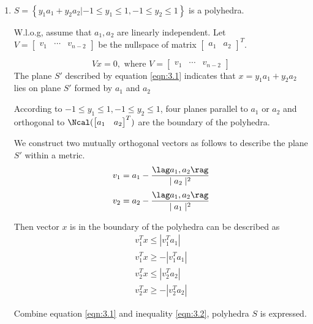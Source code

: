 \begin{solution}
\par{~}

\begin{enumerate}

\item { $S=\left\{y_{1} a_{1}+y_{2} a_{2} |-1 \leq y_{1} \leq 1,-1 \leq y_{2} \leq 1\right\}$ is a polyhedra.

W.l.o.g, assume that $a_1,a_2$ are linearly independent. Let $V = \begin{bmatrix} v_1 & \cdots & v_{n-2} \end{bmatrix} $ be the nullspace of matrix $ \begin{bmatrix} a_1 & a_2 \end{bmatrix} ^T $. 

\begin{equation}
Vx = 0, \text{ where }  V = \begin{bmatrix} v_1 & \cdots & v_{n-2} \end{bmatrix}
\label{eqn:3.1}
\end{equation}
The plane $S'$ described by equation \ref{eqn:3.1} indicates that $x = y_{1} a_{1}+y_{2} a_{2}$ lies on plane $S'$ formed by $a_1$ and $a_2$

According to $-1 \leq y_{1} \leq 1,-1 \leq y_{2} \leq 1$, four planes parallel to $a_1$ or $a_2$ and orthogonal to $\Ncal(\begin{bmatrix} a_1 & a_2 \end{bmatrix} ^T)$ are the boundary of the polyhedra.

We construct two mutually orthogonal vectors as follows to describe the plane $S'$ within a metric.
$$v_1 = a_1 - \frac{\lag a_1 , a_2\rag}{\mid a_2 \mid ^2}$$
$$v_2 = a_2- \frac{\lag a_1 , a_2\rag}{\mid a_1 \mid ^2}$$

Then vector $x$ is in the boundary of the polyhedra can be described as
\begin{equation}
\begin{split}
 v_1^T x \leq \left| v_1^T a_1 \right| \\
 v_1^T x \geq - \left| v_1^T a_1 \right| \\
 v_2^T x \leq \left| v_2^T a_2 \right| \\
 v_2^T x \geq - \left| v_2^T a_2 \right| 
\end{split}
\label{eqn:3.2}
\end{equation}

Combine equation \ref{eqn:3.1} and inequality \ref{eqn:3.2}, polyhedra $S$ is expressed.

}
\end{enumerate}
\end{solution}
